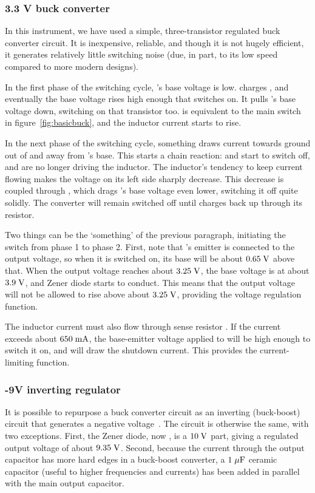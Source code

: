 \subsubsection{3.3 V buck converter}

In this instrument, we have used a simple, three-transistor regulated buck
converter circuit. It is inexpensive, reliable, and though it is not hugely
efficient, it generates relatively little switching noise (due, in part, to
its low speed compared to more modern designs).

In the first phase of the switching cycle, 's base voltage is
low.  charges , and eventually the base voltage rises
high enough that  switches on. It pulls 's base voltage
down, switching on that transistor too.  is equivalent to the main
switch in figure~\ref{fig:basicbuck}, and the inductor current starts to rise.

In the next phase of the switching cycle, something draws current towards ground
out of  and away from 's base. This starts a chain reaction:
 and  start to switch off, and are no longer driving the
inductor. The inductor's tendency to keep current flowing makes the voltage on its
left side sharply decrease. This decrease is coupled through , which
drags 's base voltage even lower, switching it off quite solidly.
The converter will remain switched off until  charges back up through
its resistor.

Two things can be the `something' of the previous paragraph, initiating the
switch from phase 1 to phase 2. First, note that 's emitter is
connected to the output voltage, so when it is switched on, its base will be
about $0.65\;\mathrm{V}$ above that. When the output voltage reaches about
$3.25\;\mathrm{V}$, the base voltage is at about $3.9\;\mathrm{V}$, and Zener diode
 starts to conduct. This means that the output voltage will not be
allowed to rise above about $3.25\;\mathrm{V}$, providing the voltage regulation
function.

The inductor current must also flow through sense resistor . If the
current exceeds about $650\;\mathrm{mA}$, the base-emitter voltage applied to
 will be high enough to switch it on, and  will draw the
shutdown current. This provides the current-limiting function.

\subsubsection{-9V inverting regulator}
It is possible to repurpose a buck converter circuit as an inverting
(buck-boost) circuit that generates a negative voltage~\cite{buckinv}. The
circuit is otherwise the same, with two exceptions. First, the Zener diode, now
, is a $10\;\mathrm{V}$ part, giving a regulated output voltage of
about $9.35\;\mathrm{V}$. Second, because the current through the output capacitor
has more hard edges in a buck-boost converter, a $1\;\mathrm{\mu F}$ ceramic
capacitor (useful to higher frequencies and currents) has been added in
parallel with the main output capacitor.

